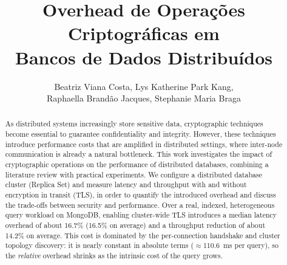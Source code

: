 \documentclass[12pt]{article}
\title{Overhead de Operações Criptográficas em\\ Bancos de Dados Distribuídos}
\author{Beatriz Viana Costa\inst{1}, Lys Katherine Park Kang\inst{1},\\
  Raphaella Brandão Jacques\inst{1}, Stephanie Maria Braga\inst{1}}
\begin{document}
\maketitle

\pagestyle{plain}
\thispagestyle{plain}

\begin{abstract}
  As distributed systems increasingly store sensitive data, cryptographic
  techniques become essential to guarantee confidentiality and integrity.
  However, these techniques introduce performance costs that are amplified in
  distributed settings, where inter-node communication is already a natural
  bottleneck. This work investigates the impact of cryptographic operations on
  the performance of distributed databases, combining a literature review with
  practical experiments. We configure a distributed database cluster (Replica Set) 
  and measure latency and throughput with and without encryption in transit (TLS), 
  in order to quantify the introduced overhead and discuss the trade-offs between 
  security and performance. Over a real, indexed, heterogeneous query workload on 
  MongoDB, enabling cluster-wide TLS introduces a median latency overhead of about 
  16.7\% (16.5\% on average) and a throughput reduction of about 14.2\% on average. 
  This cost is dominated by the per-connection handshake and cluster topology discovery: 
  it is nearly constant in absolute terms ($\approx$110.6~ms per query), so the 
  \emph{relative} overhead shrinks as the intrinsic cost of the query grows.
\end{abstract}
\end{document}
